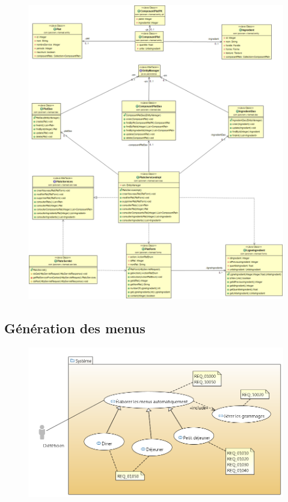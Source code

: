 \documentclass{beamer}
\begin{document}
\begin{frame}[plain]{}
\begin{figure}
\centering
\includegraphics[scale=0.175]{../CasDUtilisations/CompositionPlat/classDiagram_ComposerPlat.png}
\end{figure}
\end{frame}

\subsection{Génération des menus}
\begin{frame}[plain]{}
%
\begin{figure}
\centering
\includegraphics[scale=.500]{../CasDUtilisations/MenuGen/CasDUtilisation/MenuGen.png}
\end{figure}
\end{frame}
\end{document}
